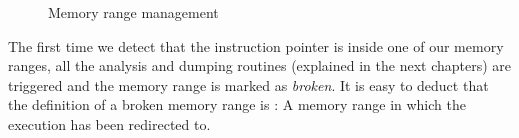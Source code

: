 \begin{figure}[H]
\caption{Memory range management}
\end{figure} 

The first time we detect that the instruction pointer is inside one of our memory ranges, all the analysis and dumping routines (explained in the next chapters) are triggered and the memory range is marked as \textit{broken}. It is easy to deduct that the definition of a broken memory range is : A memory range in which the execution has been redirected to. 